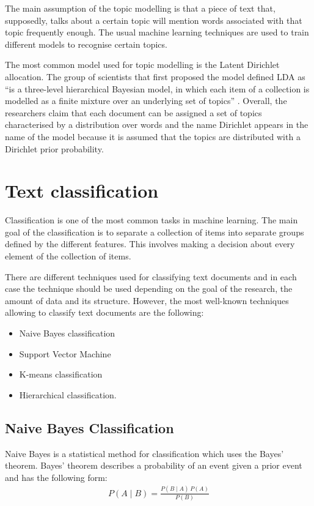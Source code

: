 The main assumption of the topic modelling is that a piece of text that, supposedly, talks about a certain topic will mention words associated with that topic frequently enough. The usual machine learning techniques are used to train different models to recognise certain topics. 

The most common model used for topic modelling is the Latent Dirichlet allocation. The group of scientists that first proposed the model defined LDA as ``is a three-level hierarchical Bayesian model, in which each item of a collection is modelled as a finite mixture over an underlying set of topics'' \cite{blei2003latent}. Overall, the researchers claim that each document can be assigned a set of topics characterised by a distribution over words and the name Dirichlet appears in the name of the model because it is assumed that the topics are distributed with a Dirichlet prior probability. 

\section{Text classification}
\label{sec:text_classification}

Classification is one of the most common tasks in machine learning. The main goal of the classification is to separate a collection of items into separate groups defined by the different features. This involves making a decision about every element of the collection of items.

There are different techniques used for classifying text documents and in each case the technique should be used depending on the goal of the research, the amount of data and its structure. However, the most well-known techniques allowing to classify text documents are the following:
\begin{itemize}
    \item Naive Bayes classification
    \item Support Vector Machine
    \item K-means classification
    \item Hierarchical classification.
\end{itemize}

\subsection{Naive Bayes Classification}
Naive Bayes is a statistical method for classification which uses the Bayes' theorem. Bayes' theorem describes a probability of an event given a prior event and has the following form:
\begin{align}
    P(A \mid B) = \frac{P(B \mid A) \, P(A)}{P(B)}
\end{align}


